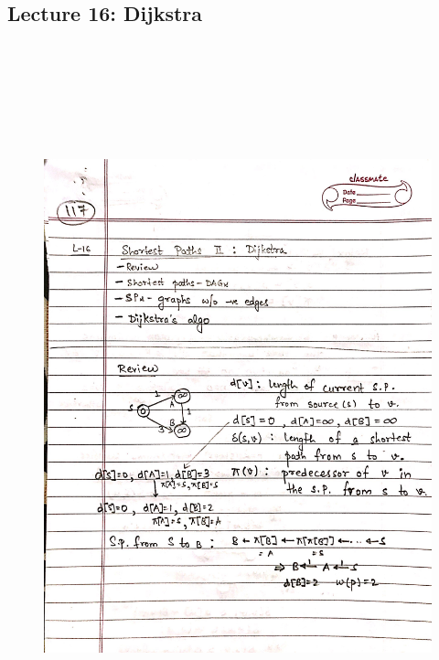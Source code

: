 \newpage
{\color{black} \subsection*{Lecture 16: Dijkstra}}
\begin{figure}[H]
    \centering
    \includegraphics[width=16cm, height=21cm]{"./MIT-6.006/MIT-6006-117"}
\end{figure}

